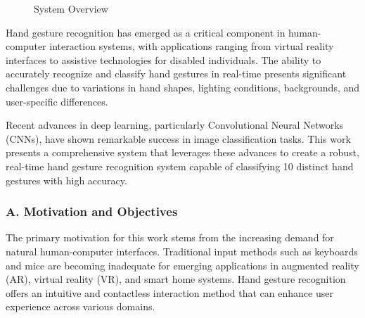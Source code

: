 \documentclass[11pt,a4paper,twoside]{article}
\begin{document}
\begin{wrapfigure}{r}{0.48\textwidth}
\centering
{}
\caption*{\small System Overview}
\end{wrapfigure}

Hand gesture recognition has emerged as a critical component in
human-computer interaction systems, with applications ranging from
virtual reality interfaces to assistive technologies for disabled
individuals. The ability to accurately recognize and classify hand
gestures in real-time presents significant challenges due to variations
in hand shapes, lighting conditions, backgrounds, and user-specific
differences.

Recent advances in deep learning, particularly Convolutional Neural
Networks (CNNs), have shown remarkable success in image classification
tasks. This work presents a comprehensive system that leverages these
advances to create a robust, real-time hand gesture recognition system
capable of classifying 10 distinct hand gestures with high accuracy.

\subsubsection{A. Motivation and
Objectives}

The primary motivation for this work stems from the increasing demand
for natural human-computer interfaces. Traditional input methods such as
keyboards and mice are becoming inadequate for emerging applications in
augmented reality (AR), virtual reality (VR), and smart home systems.
Hand gesture recognition offers an intuitive and contactless interaction
method that can enhance user experience across various domains.
\end{document}
